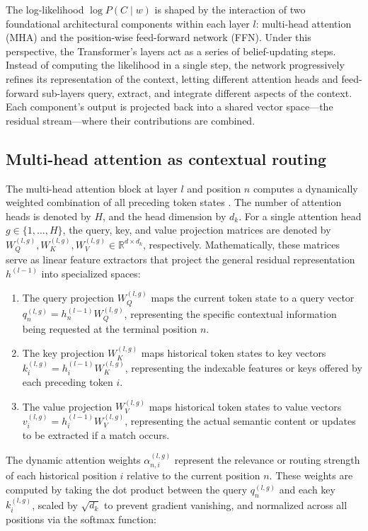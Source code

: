 \documentclass[11pt,a4paper]{article}
\begin{document}
	The log-likelihood $\log P(C \mid w)$ is shaped by the interaction of two foundational architectural components within each layer $l$: multi-head attention (MHA) and the position-wise feed-forward network (FFN). Under this perspective, the Transformer's layers act as a series of belief-updating steps. Instead of computing the likelihood in a single step, the network progressively refines its representation of the context, letting different attention heads and feed-forward sub-layers query, extract, and integrate different aspects of the context. Each component's output is projected back into a shared vector space---the residual stream---where their contributions are combined.
	
	\subsection{Multi-head attention as contextual routing}
	The multi-head attention block at layer $l$ and position $n$ computes a dynamically weighted combination of all preceding token states \citep{vaswani2017attention}. The number of attention heads is denoted by $H$, and the head dimension by $d_k$. For a single attention head $g \in \{1, \dots, H\}$, the query, key, and value projection matrices are denoted by $W_Q^{(l, g)}, W_K^{(l, g)}, W_V^{(l, g)} \in \mathbb{R}^{d \times d_k}$, respectively. Mathematically, these matrices serve as linear feature extractors that project the general residual representation $h^{(l-1)}$ into specialized spaces:
	\begin{enumerate}
		\item The query projection $W_Q^{(l, g)}$ maps the current token state to a query vector $q_n^{(l, g)} = h_n^{(l-1)}W_Q^{(l, g)}$, representing the specific contextual information being requested at the terminal position $n$.
		\item The key projection $W_K^{(l, g)}$ maps historical token states to key vectors $k_i^{(l, g)} = h_i^{(l-1)}W_K^{(l, g)}$, representing the indexable features or keys offered by each preceding token $i$.
		\item The value projection $W_V^{(l, g)}$ maps historical token states to value vectors $v_i^{(l, g)} = h_i^{(l-1)}W_V^{(l, g)}$, representing the actual semantic content or updates to be extracted if a match occurs.
	\end{enumerate}

	The dynamic attention weights $\alpha_{n,i}^{(l, g)}$ represent the relevance or routing strength of each historical position $i$ relative to the current position $n$. These weights are computed by taking the dot product between the query $q_n^{(l, g)}$ and each key $k_i^{(l, g)}$, scaled by $\sqrt{d_k}$ to prevent gradient vanishing, and normalized across all positions via the softmax function:
	
\end{document}
